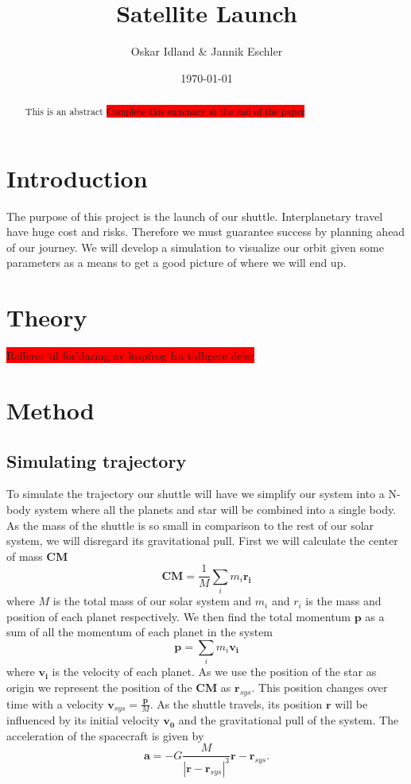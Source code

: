 \documentclass[reprint,english,notitlepage]{revtex4-2}
\begin{document}
\title{Satellite Launch}
\author{Oskar Idland \& Jannik Eschler}
\date{\today}

\begin{abstract}
    This is an abstract \colorbox{red}{Complete this summary at the end of the paper} 
\end{abstract}
\maketitle

\section{Introduction} \label{sec:introduction}
The purpose of this project is the launch of our shuttle.
Interplanetary travel have huge cost and risks.
Therefore we must guarantee success by planning ahead of our journey.
We will develop a simulation to visualize our orbit given some parameters as a means to get a good picture of where we will end up.

\section{Theory} \label{sec: theory}
\colorbox{red}{Refferer til forklaring av leapfrog fra tidligere deler}

\section{Method} \label{sec: method}
\subsection{Simulating trajectory} \label{ssec: simulating trajectory}
To simulate the trajectory our shuttle will have we simplify our system into a N-body system where all the planets and star will be combined into a single body. As the mass of the shuttle is so small in comparison to the rest of our solar system, we will disregard its gravitational pull. First we will calculate the center of mass $ \mathbf{CM} $
\[
\mathbf{CM} = \frac{1}{M} \sum_{i} m_i \mathbf{r_i}
\]
where $ M $ is the total mass of our solar system and $ m_i $ and $ r_i $ is the mass and position of each planet respectively. We then find the total momentum $ \mathbf{p} $ as a sum of all the momentum of each planet in the system
\[
\mathbf{p} = \sum_{i} m_i \mathbf{v_i}
\]
where $ \mathbf{v_i} $ is the velocity of each planet. 
As we use the position of the star as origin we represent the position of the $ \mathbf{CM} $ as $ \mathbf{r}_{sys} $. This position changes over time with a velocity $ \mathbf{v}_{sys} = \frac{\mathbf{p}}{M} $.  
As the shuttle travels, its position $ \mathbf{r} $ will be influenced by its initial velocity $ \mathbf{v_0} $ and the gravitational pull of the system. The acceleration of the spacecraft is given by 
\[
\mathbf{a} = -G \frac{M}{\left\vert \mathbf{r} - \mathbf{r}_{sys} \right\vert ^{3}} \mathbf{r} - \mathbf{r}_{sys}.
\]
\end{document}
